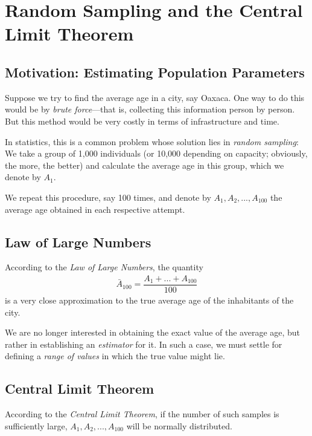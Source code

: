 \section{Random Sampling and the Central Limit Theorem}

\subsection{Motivation: Estimating Population Parameters}

Suppose we try to find the average age in a city, say Oaxaca. One way to do this would be by \emph{brute force}—that is, collecting this information person by person. But this method would be very costly in terms of infrastructure and time.

In statistics, this is a common problem whose solution lies in \emph{random sampling}: We take a group of 1,000 individuals (or 10,000 depending on capacity; obviously, the more, the better) and calculate the average age in this group, which we denote by $A_{1}.$

We repeat this procedure, say 100 times, and denote by $A_{1}, A_{2},...,A_{100}$ the average age obtained in each respective attempt.

\subsection{Law of Large Numbers}

According to the \emph{Law of Large Numbers}, the quantity
\begin{align}
	\bar{A}_{100}=\dfrac{A_{1}+...+A_{100}}{100}
\end{align}
is a very close approximation to the true average age of the inhabitants of the city.

\begin{remark}
	We are no longer interested in obtaining the exact value of the average age, but rather in establishing an \emph{estimator} for it. In such a case, we must settle for defining a \emph{range of values} in which the true value might lie.
\end{remark}

\subsection{Central Limit Theorem}

According to the \emph{Central Limit Theorem}, if the number of such samples is sufficiently large, $A_{1},A_{2},...,A_{100}$ will be normally distributed.

